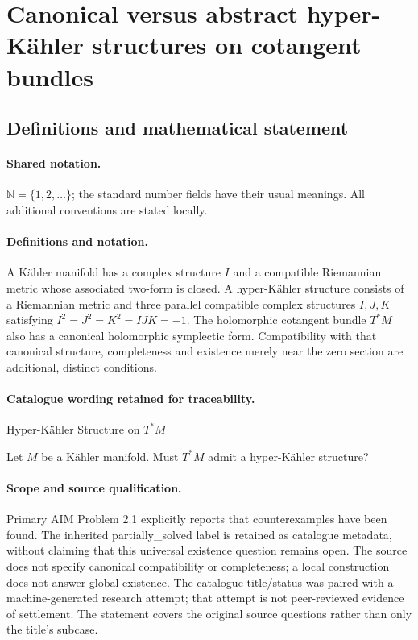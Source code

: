 \documentclass[11pt]{article}
\begin{document}
\section{Canonical versus abstract hyper-Kähler structures on cotangent bundles}\label{statement}

\subsection{Definitions and mathematical statement}

\paragraph{Shared notation.}$\mathbb N=\{1,2,\ldots\}$; the standard number fields have their usual meanings. All additional conventions are stated locally.


\paragraph{Definitions and notation.}A Kähler manifold has a complex structure $I$ and a compatible Riemannian metric whose associated two-form is closed. A hyper-Kähler structure consists of a Riemannian metric and three parallel compatible complex structures $I,J,K$ satisfying $I^2=J^2=K^2=IJK=-1$. The holomorphic cotangent bundle $T^*M$ also has a canonical holomorphic symplectic form. Compatibility with that canonical structure, completeness and existence merely near the zero section are additional, distinct conditions.

\paragraph{Catalogue wording retained for traceability.}
Hyper-K\"{a}hler Structure on $T^* M$

Let $M$ be a K\"{a}hler manifold. Must $T^*M$ admit a hyper-K\"{a}hler structure?
\paragraph{Scope and source qualification.}Primary AIM Problem 2.1 explicitly reports that counterexamples have been found. The inherited partially_solved label is retained as catalogue metadata, without claiming that this universal existence question remains open. The source does not specify canonical compatibility or completeness; a local construction does not answer global existence. The catalogue title/status was paired with a machine-generated research attempt; that attempt is not peer-reviewed evidence of settlement. The statement covers the original source questions rather than only the title’s subcase.
\end{document}

